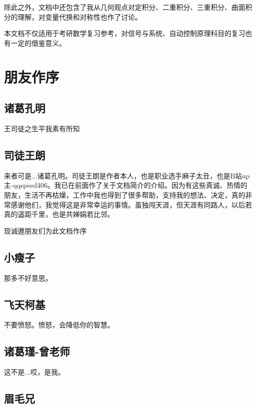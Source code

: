 \documentclass[12pt]{report}
\begin{document}
除此之外，文档中还包含了我从几何观点对定积分、二重积分、三重积分、曲面积分的理解，对变量代换和对称性也作了讨论。

本文档不仅适用于考研数学复习参考，对信号与系统、自动控制原理科目的复习也有一定的借鉴意义。

 \chapter*{朋友作序}
 \section*{\textbullet \hspace{0.5em}诸葛孔明}
 
 \mfMicroscope 王司徒之生平我素有所知
 
 \section*{\textbullet \hspace{0.5em}司徒王朗}
 
 来者可是...诸葛孔明。司徒王朗是作者本人，也是职业选手麻子太丑，也是B站up主-qqspeed406。我已在前面作了关于文档简介的介绍。因为有这些真诚、热情的朋友，生活不再枯燥，工作中我也得到了很多帮助，支持我的想法、决定，真的非常感谢他们，我觉得这是非常幸运的事情。虽独闯天涯，但天涯有同路人，以后若真的遥距千里，也是共婵娟若比邻。
 
 现诚邀朋友们为此文档作序
 
  \section*{\textbullet \hspace{0.5em}小瘦子}

 那多不好意思。  
   
 \section*{\textbullet \hspace{0.5em}飞天柯基} 
   
 不要愤怒。愤怒，会降低你的智慧。
 
 \section*{诸葛瑾-曾老师}
 
 这不是...哎，是我。
 
 \section*{眉毛兄}
 
\end{document}
